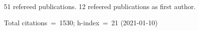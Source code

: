 51 refereed publications. 12 refeered publications as first author.

Total citations~=~1530; h-index~=~21 (2021-01-10)